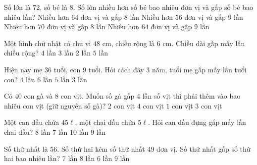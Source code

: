 \begin{ex} %
Số lớn là 72, số bé là 8. Số lớn nhiều hơn số bé bao nhiêu đơn vị và gấp số bé bao nhiêu lần?
\choice
{Nhiều hơn $64$ đơn vị và gấp $8$ lần}
{Nhiều hơn $56$ đơn vị và gấp $9$ lần}
{Nhiều hơn $70$ đơn vị và gấp $8$ lần}
{\True Nhiều hơn $64$ đơn vị và gấp $9$ lần}
\end{ex}

\begin{ex} %
Một hình chữ nhật có chu vi $48\text{ cm}$, chiều rộng là $6\text{ cm}$. Chiều dài gấp mấy lần chiều rộng?
\choice
{$4$ lần}
{\True $3$ lần}
{$2$ lần}
{$5$ lần}
\end{ex}

\begin{ex} %
Hiện nay mẹ 36 tuổi, con 9 tuổi. Hỏi cách đây 3 năm, tuổi mẹ gấp mấy lần tuổi con?
\choice
{$4$ lần}
{$6$ lần}
{\True $5$ lần}
{$3$ lần}
\end{ex}

\begin{ex} %
Có 40 con gà và 8 con vịt. Muốn số gà gấp 4 lần số vịt thì phải thêm vào bao nhiêu con vịt (giữ nguyên số gà)?
\choice
{\True $2$ con vịt}
{$4$ con vịt}
{$1$ con vịt}
{$3$ con vịt}
\end{ex}

\begin{ex} %
Một can dầu chứa $45\ell$, một chai dầu chứa $5\ell$. Hỏi can dầu đựng gấp mấy lần chai dầu?
\choice
{$8$ lần}
{$7$ lần}
{$10$ lần}
{\True $9$ lần}
\end{ex}

\begin{ex} %
Số thứ nhất là 56. Số thứ hai kém số thứ nhất 49 đơn vị. Số thứ nhất gấp số thứ hai bao nhiêu lần?
\choice
{$7$ lần}
{\True $8$ lần}
{$6$ lần}
{$9$ lần}
\end{ex}

